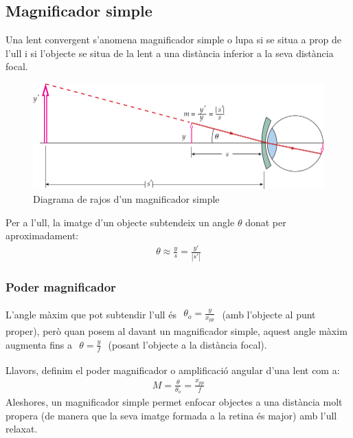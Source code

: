\subsection{Magnificador simple}
Una lent convergent s'anomena magnificador simple o lupa si se situa a prop de l'ull i si l'objecte se situa de la lent a una distància inferior a la seva distància focal.
\begin{figure}[H]
\centering
    \includegraphics[width=\textwidth]{images/5/52-magnificador.png}
\caption{Diagrama de rajos d'un magnificador simple}
\end{figure}
Per a l'ull, la imatge d'un objecte subtendeix un angle $\theta$ donat per aproximadament:
\begin{align}
    \boxed{\theta \approx \frac{y}{s} = \frac{y'}{|s'|}}
\end{align}
\subsubsection*{Poder magnificador}
L'angle màxim que pot subtendir l'ull és $\begin{gathered}\theta_{o} = \frac{y}{x_{pp}}\end{gathered}$ (amb l'objecte al punt proper), però quan posem al davant un magnificador simple, aquest angle màxim augmenta fins a $\begin{gathered}\theta = \frac{y}{f}\end{gathered}$ (posant l'objecte a la distància focal). 

Llavors, definim el poder magnificador o amplificació angular d'una lent com a:
\begin{align}
    \boxed{M = \frac{\theta}{\theta_{o}} = \frac{x_{pp}}{f}}
\end{align}
Aleshores, un magnificador simple permet enfocar objectes a una distància molt propera (de manera que la seva imatge formada a la retina és major) amb l'ull relaxat.

